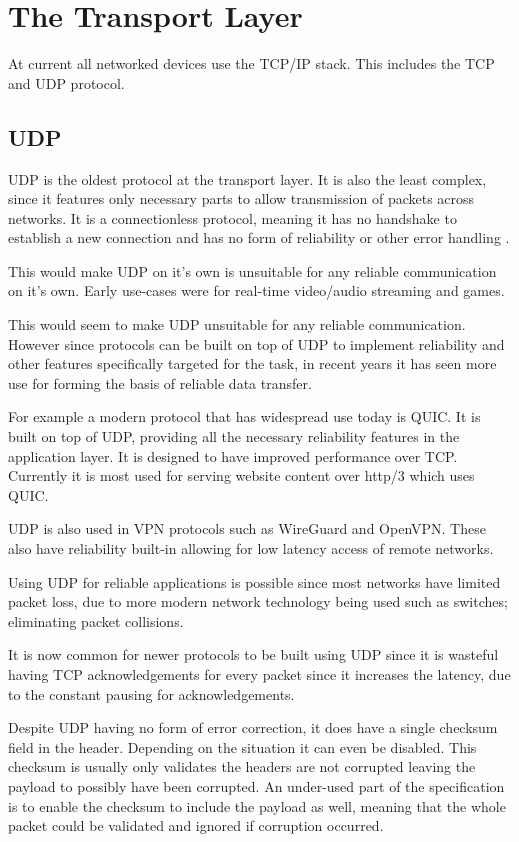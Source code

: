 \section{The Transport Layer}
At current all networked devices use the TCP/IP stack. This includes the TCP and UDP protocol.

\subsection*{UDP}
UDP is the oldest protocol at the transport layer. It is also the least complex, since it features only necessary parts to allow transmission of packets across networks. It is a connectionless protocol, meaning it has no handshake to establish a new connection and has no form of reliability or other error handling \parencite{udp-rfc768}.

This would make UDP on it's own is unsuitable for any reliable communication on it's own. Early use-cases were for real-time video/audio streaming and games.

This would seem to make UDP unsuitable for any reliable communication. However since protocols can be built on top of UDP to implement reliability and other features specifically targeted for the task, in recent years it has seen more use for forming the basis of reliable data transfer.

For example a modern protocol that has widespread use today is QUIC. It is built on top of UDP, providing all the necessary reliability features in the application layer. It is designed to have improved performance over TCP. Currently it is most used for serving website content over http/3 which uses QUIC.

UDP is also used in VPN protocols such as WireGuard and OpenVPN. These also have reliability built-in allowing for low latency access of remote networks.

Using UDP for reliable applications is possible since most networks have limited packet loss, due to more modern network technology being used such as switches; eliminating packet collisions.

It is now common for newer protocols to be built using UDP since it is wasteful having TCP acknowledgements for every packet since it increases the latency, due to the constant pausing for acknowledgements.

Despite UDP having no form of error correction, it does have a single checksum field in the header. Depending on the situation it can even be disabled. This checksum is usually only validates the headers are not corrupted leaving the payload to possibly have been corrupted. An under-used part of the specification is to enable the checksum to include the payload as well, meaning that the whole packet could be validated and ignored if corruption occurred.

